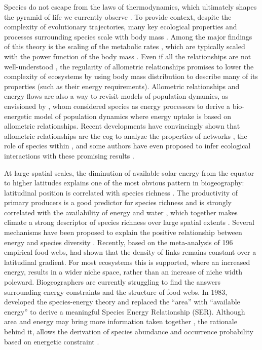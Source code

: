 Species do not escape from the laws of thermodynamics, which ultimately
shapes the pyramid of life we currently observe \citep{Trebilco2013}. To
provide context, despite the complexity of evolutionary trajectories,
many key ecological properties and processes surrounding species scale
with body mass \citep[i.e.~metabolic theory of
ecology@Brown2004;][]{Woodward2005a} . Among the major findings of this
theory is the scaling of the metabolic rates \citep{Gillooly2001}, which
are typically scaled with the power function of the body mass
\citep[often between 2/3 and 3/4][]{White2013}. Even if all the
relationships are not well-understood \citep[see the case of abundances
reviewed in][ and the recent relationship between prey and predator
biomasses \citet{Hatton2015}]{White2007}, the regularity of allometric
relationships promises to lower the complexity of ecosystems by using
body mass distribution to describe many of its properties (such as their
energy requirements). Allometric relationships and energy flows are also
a way to revisit models of population dynamics, as envisioned by
\citet{Yodzis1992}, whom considered species as energy processors to
derive a bio-energetic model of population dynamics where energy uptake
is based on allometric relationships. Recent developments have
convincingly shown that allometric relationships are the cog to analyze
the properties of networks \citep[such as stability][]{Brose2006}, the
role of species within \citep{Schneider2012}, and some authors have even
proposed to infer ecological interactions with these promising results
\citep{Gravel2013, Petchey2008}.

At large spatial scales, the diminution of available solar energy from
the equator to higher latitudes explains one of the most obvious pattern
in biogeography: latitudinal position is correlated with species
richness \citep{Rhode1992, Stevens1989, Evans2005}. The productivity of
primary producers is a good predictor for species richness
\citep{Evans2005, Storch2005} and is strongly correlated with the
availability of energy and water , which together makes climate a strong
descriptor of species richness over large spatial extents
\citep{Hawkins2003}. Several mechanisms have been proposed to explain
the positive relationship between energy and species diversity
\citep[see][ for a review]{Evans2005} . Recently, based on the
meta-analysis of 196 empirical food webs, \citet{Cirtwill2015a} had
shown that the density of links remains constant over a latitudinal
gradient. For most ecosystems this is supported, where an increased
energy, results in a wider niche space, rather than an increase of niche
width poleward. Biogeographers are currently struggling to find the
answers surrounding energy constraints and the structure of food webs.
In 1983, \citet{Wright1983} developed the species-energy theory and
replaced the ``area'' with ``available energy'' to derive a meaningful
Species Energy Relationship (SER). Although area and energy may bring
more information taken together \citep{Storch2005}, the rationale behind
it, allows the derivation of species abundance and occurrence
probability based on energetic constraint \citep{Wright1983}.

